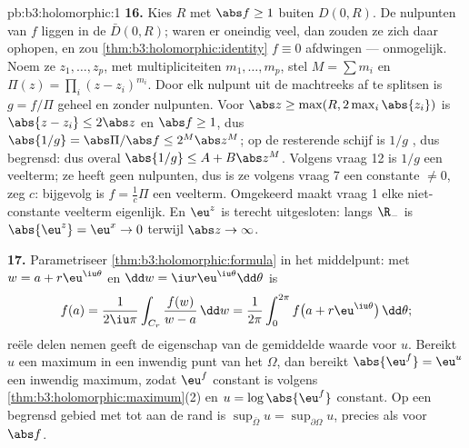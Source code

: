 \begin{solution}{pb:b3:holomorphic:1}
\textbf{16.} Kies $R$ met $\abs f \geq 1$ buiten $D(0, R)$. De
nulpunten van $f$ liggen in de  $\bar D(0, R)$; waren er
oneindig veel, dan zouden ze zich daar ophopen, en zou
\cref{thm:b3:holomorphic:identity} $f \equiv 0$ afdwingen ---
onmogelijk. Noem ze $z_1, \dots, z_p$, met multipliciteiten
$m_1, \dots, m_p$, stel $M = \sum m_i$ en $\Pi(z) = \prod_i(z -
z_i)^{m_i}$. Door elk nulpunt uit de machtreeks af te splitsen is
$g = f/\Pi$ geheel en zonder nulpunten. Voor $\abs z \geq \max(R,
2\max_i\abs{z_i})$ is $\abs{z - z_i} \leq 2\abs z$ en $\abs f
\geq 1$, dus $\abs{1/g} = \abs\Pi/\abs f \leq 2^M\abs z^M$; op de
resterende  schijf is $1/g$ , dus begrensd: dus
overal $\abs{1/g} \leq A + B\abs z^M$. Volgens vraag 12 is $1/g$
een veelterm; ze heeft geen nulpunten, dus is ze volgens vraag 7
een constante $\neq 0$, zeg $c$: bijgevolg is $f = \frac1c\Pi$
een veelterm. Omgekeerd maakt vraag 1 elke niet-constante
veelterm eigenlijk. En $\eu^z$ is terecht uitgesloten: langs
$\R_-$ is $\abs{\eu^z} = \eu^x \to 0$ terwijl $\abs z \to
\infty$.

\textbf{17.} Parametriseer \cref{thm:b3:holomorphic:formula} in
het middelpunt: met $w = a + r\eu^{\iu\theta}$ en $\dd w = \iu
r\eu^{\iu\theta}\dd\theta$ is
\[
f(a) = \frac1{2\iu\pi}\int_{C_r}\frac{f(w)}{w - a}\,\dd w
= \frac1{2\pi}\int_0^{2\pi}
f\bigl(a + r\eu^{\iu\theta}\bigr)\,\dd\theta ;
\]
reële delen nemen geeft de eigenschap van de gemiddelde waarde
voor $u$. Bereikt $u$ een maximum in een inwendig punt van het
 $\Omega$, dan bereikt $\abs{\eu^f} = \eu^u$ een
inwendig maximum, zodat $\eu^f$ constant is volgens
\cref{thm:b3:holomorphic:maximum}(2) en $u = \log\abs{\eu^f}$
constant. Op een begrensd gebied met  tot aan de rand
is $\sup_{\bar\Omega}u = \sup_{\partial\Omega}u$, precies als
voor $\abs f$.


\end{solution}

